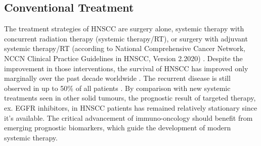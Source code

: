 \documentclass[12pt, a4paper]{article}
\begin{document}
% 
% 


\subsection{Conventional Treatment}



The treatment strategies of HNSCC are surgery alone, systemic therapy with concurrent radiation therapy (systemic therapy/RT), or surgery with adjuvant systemic therapy/RT (according to National Comprehensive Cancer Network, NCCN Clinical Practice Guidelines in HNSCC, Version 2.2020) \citep{Pfister2020a}. Despite the improvement in those interventions, the survival of HNSCC has improved only marginally over the past decade worldwide \citep{hpa2019}.
The recurrent disease is still observed in up to 50\% of all patients \citep{Forastiere2001,Warnakulasuriya2009}.
By comparison with new systemic treatments seen in other solid tumours, the prognostic result of targeted therapy, ex. EGFR inhibitors, in HNSCC patients has remained relatively stationary since it's available\citep{Argiris2015a}.
The critical advancement of immuno-oncology should benefit from emerging prognostic biomarkers, which guide the development of modern systemic therapy.
\end{document}
